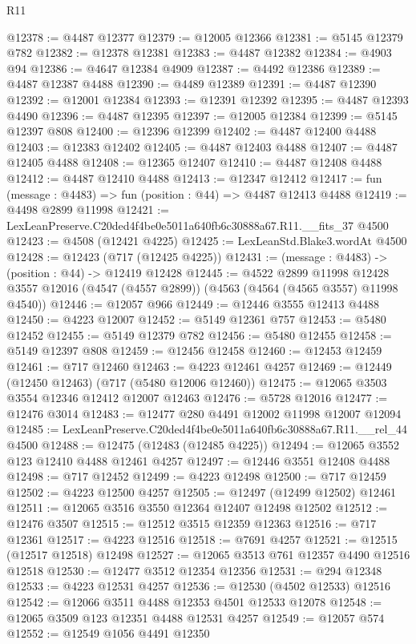 \begin{lexlean}{R11}
\begin{coremodule}
@12378 := @4487 @12377
@12379 := @12005 @12366
@12381 := @5145 @12379 @782
@12382 := @12378 @12381
@12383 := @4487 @12382
@12384 := @4903 @94
@12386 := @4647 @12384 @4909
@12387 := @4492 @12386
@12389 := @4487 @12387 @4488
@12390 := @4489 @12389
@12391 := @4487 @12390
@12392 := @12001 @12384
@12393 := @12391 @12392
@12395 := @4487 @12393 @4490
@12396 := @4487 @12395
@12397 := @12005 @12384
@12399 := @5145 @12397 @808
@12400 := @12396 @12399
@12402 := @4487 @12400 @4488
@12403 := @12383 @12402
@12405 := @4487 @12403 @4488
@12407 := @4487 @12405 @4488
@12408 := @12365 @12407
@12410 := @4487 @12408 @4488
@12412 := @4487 @12410 @4488
@12413 := @12347 @12412
@12417 := fun (message : @4483) => fun (position : @44) => @4487 @12413 @4488
@12419 := @4498 @2899 @11998
@12421 := LexLeanPreserve.C20ded4f4be0e5011a640fb6c30888a67.R11.__fits_37 @4500
@12423 := @4508 (@12421 @4225)
@12425 := LexLeanStd.Blake3.wordAt @4500
@12428 := @12423 (@717 (@12425 @4225))
@12431 := (message : @4483) -> (position : @44) -> @12419 @12428
@12445 := @4522
    @2899
    @11998
    @12428
    @3557
    @12016
    (@4547 (@4557 @2899))
    (@4563 (@4564 (@4565 @3557) @11998 @4540))
@12446 := @12057 @966
@12449 := @12446 @3555 @12413 @4488
@12450 := @4223 @12007
@12452 := @5149 @12361 @757
@12453 := @5480 @12452
@12455 := @5149 @12379 @782
@12456 := @5480 @12455
@12458 := @5149 @12397 @808
@12459 := @12456 @12458
@12460 := @12453 @12459
@12461 := @717 @12460
@12463 := @4223 @12461 @4257
@12469 := @12449 (@12450 @12463) (@717 (@5480 @12006 @12460))
@12475 := @12065 @3503 @3554 @12346 @12412 @12007 @12463
@12476 := @5728 @12016
@12477 := @12476 @3014
@12483 := @12477 @280 @4491 @12002 @11998 @12007 @12094
@12485 := LexLeanPreserve.C20ded4f4be0e5011a640fb6c30888a67.R11.__rel_44 @4500
@12488 := @12475 (@12483 (@12485 @4225))
@12494 := @12065 @3552 @123 @12410 @4488 @12461 @4257
@12497 := @12446 @3551 @12408 @4488
@12498 := @717 @12452
@12499 := @4223 @12498
@12500 := @717 @12459
@12502 := @4223 @12500 @4257
@12505 := @12497 (@12499 @12502) @12461
@12511 := @12065 @3516 @3550 @12364 @12407 @12498 @12502
@12512 := @12476 @3507
@12515 := @12512 @3515 @12359 @12363
@12516 := @717 @12361
@12517 := @4223 @12516
@12518 := @7691 @4257
@12521 := @12515 (@12517 @12518) @12498
@12527 := @12065 @3513 @761 @12357 @4490 @12516 @12518
@12530 := @12477 @3512 @12354 @12356
@12531 := @294 @12348
@12533 := @4223 @12531 @4257
@12536 := @12530 (@4502 @12533) @12516
@12542 := @12066 @3511 @4488 @12353 @4501 @12533 @12078
@12548 := @12065 @3509 @123 @12351 @4488 @12531 @4257
@12549 := @12057 @574
@12552 := @12549 @1056 @4491 @12350

\end{coremodule}
\end{lexlean}
